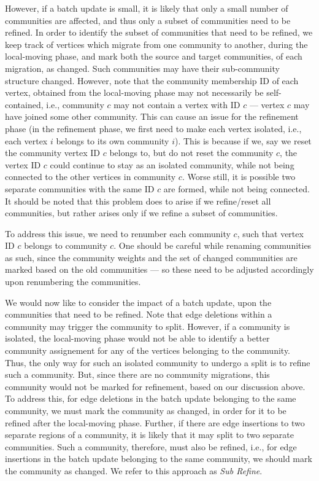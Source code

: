 However, if a batch update is small, it is likely that only a small number of communities are affected, and thus only a subset of communities need to be refined. In order to identify the subset of communities that need to be refined, we keep track of vertices which migrate from one community to another, during the local-moving phase, and mark both the source and target communities, of each migration, as changed. Such communities may have their sub-community structure changed. However, note that the community membership ID of each vertex, obtained from the local-moving phase may not necessarily be self-contained, i.e., community $c$ may not contain a vertex with ID $c$ --- vertex $c$ may have joined some other community. This can cause an issue for the refinement phase (in the refinement phase, we first need to make each vertex isolated, i.e., each vertex $i$ belongs to its own community $i$). This is because if we, say we reset the community vertex ID $c$ belongs to, but do not reset the community $c$, the vertex ID $c$ could continue to stay as an isolated community, while not being connected to the other vertices in community $c$. Worse still, it is possible two separate communities with the same ID $c$ are formed, while not being connected. It should be noted that this problem does to arise if we refine/reset all communities, but rather arises only if we refine a subset of communities.

To address this issue, we need to renumber each community $c$, such that vertex ID $c$ belongs to community $c$. One should be careful while renaming communities as such, since the community weights and the set of changed communities are marked based on the old communities --- so these need to be adjusted accordingly upon renumbering the communities.

We would now like to consider the impact of a batch update, upon the communities that need to be refined. Note that edge deletions within a community may trigger the community to split. However, if a community is isolated, the local-moving phase would not be able to identify a better community assignement for any of the vertices belonging to the community. Thus, the only way for such an isolated community to undergo a split is to refine such a community. But, since there are no community migrations, this community would not be marked for refinement, based on our discussion above. To address this, for edge deletions in the batch update belonging to the same community, we must mark the community as changed, in order for it to be refined after the local-moving phase. Further, if there are edge insertions to two separate regions of a community, it is likely that it may split to two separate communities. Such a community, therefore, must also be refined, i.e., for edge insertions in the batch update belonging to the same community, we should mark the community as changed. We refer to this approach as \textit{Sub Refine}.

